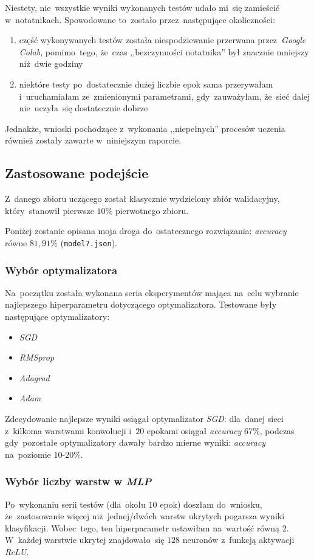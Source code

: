 \documentclass[11pt, a4paper]{article}
\begin{document}
Niestety, nie~wszystkie wyniki wykonanych testów udało mi~się zamieścić w~notatnikach. Spowodowane to~zostało przez~następujące okoliczności:
\begin{enumerate}
    \item część wykonywanych testów została niespodziewanie przerwana przez~\textit{Google Colab}, pomimo~tego, że~czas ,,bezczynności notatnika'' był znacznie mniejszy niż~dwie godziny 
    \item niektóre testy po~dostatecznie dużej liczbie epok sama przerywałam i~uruchamiałam ze~zmienionymi parametrami, gdy~zauważyłam, że~sieć dalej nie~uczyła~się dostatecznie dobrze
\end{enumerate}

Jednakże, wnioski pochodzące z~wykonania ,,niepełnych'' procesów uczenia również zostały zawarte w~niniejszym raporcie.

\subsection{Zastosowane podejście}
Z~danego zbioru uczącego został klasycznie wydzielony zbiór walidacyjny, który~stanowił pierwsze $10\%$ pierwotnego zbioru.

Poniżej zostanie opisana moja droga do~ostatecznego rozwiązania: \textit{accuracy} równe $81,91\%$ (\texttt{model7.json}).

\subsubsection{Wybór optymalizatora}
Na~początku została wykonana seria eksperymentów mająca na~celu wybranie najlepszego hiperparametru dotyczącego optymalizatora. Testowane były następujące optymalizatory:
\begin{itemize}
    \item \textit{SGD}
    \item \textit{RMSprop}
    \item \textit{Adagrad}
    \item \textit{Adam}
\end{itemize}

Zdecydowanie najlepsze wyniki osiągał optymalizator \textit{SGD}: dla~danej sieci z~kilkoma warstwami konwolucji i~$20$ epokami osiągał \textit{accuracy} $67\%$, podczas gdy~pozostałe optymalizatory dawały bardzo mierne wyniki: \textit{accuracy} na~poziomie $10$-$20\%$.

\subsubsection{Wybór liczby warstw w \textit{MLP}}
Po~wykonaniu serii testów (dla~okołu $10$ epok) doszłam do~wniosku, że~zastosowanie więcej niż~jednej/dwóch warstw ukrytych pogarsza wyniki klasyfikacji. Wobec~tego, ten hiperparametr ustawiłam na~wartość równą $2$. W~każdej warstwie ukrytej znajdowało~się $128$ neuronów z~funkcją aktywacji \textit{ReLU}.
\end{document}
